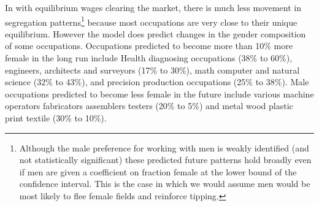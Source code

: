 \documentclass[12pt]{article}
\begin{document}


In with equilibrium wages clearing the market, there is much less movement in segregation patterns\footnote{Although the male preference for working with men is weakly identified (and not statistically significant) these predicted future patterns hold broadly even if men are given a coefficient on fraction female at the lower bound of the confidence interval. This is the case in which we would assume men would be most likely to flee female fields and reinforce tipping.} because most occupations are very close to their unique equilibrium. However the model does predict changes in the gender composition of some occupations. Occupations predicted to become more than 10\% more female in the long run include Health diagnosing occupations (38\% to 60\%), engineers, architects and surveyors (17\% to 30\%), math computer and natural science (32\% to 43\%), and precision production occupations (25\% to 38\%). Male occupations predicted to become less female in the future include various machine operators fabricators assemblers testers (20\% to 5\%) and metal wood plastic print textile (30\% to 10\%).
















\end{document}
